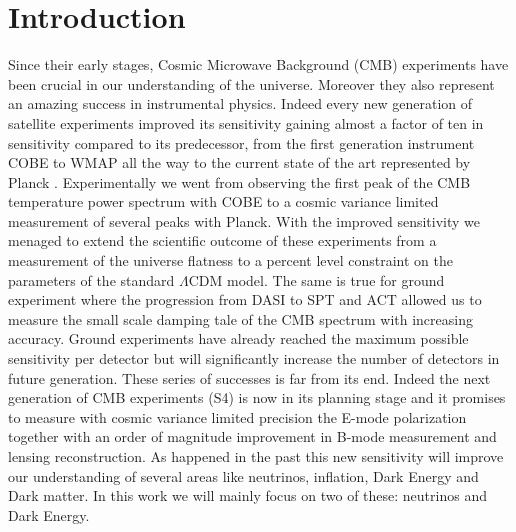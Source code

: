 \documentclass[aps,prd,preprint,groupedaddress]{revtex4-1}
\begin{document}
\pacs{}
\maketitle

\section{Introduction}\label{sec:intro}

Since their early stages, Cosmic Microwave Background (CMB) experiments have been crucial in our understanding of the universe. Moreover they also represent an amazing success in instrumental physics. Indeed every new generation of satellite experiments improved its sensitivity gaining almost a factor of ten in sensitivity compared to its predecessor, from the first generation instrument COBE to WMAP all the way to the current state of the art represented by Planck \cite{2015arXiv150201589P,2014A&A...571A..16P,2003ApJS..148..175S,2000ApJ...545L...5H,2000Natur.404..955D}.
Experimentally we went from observing the first peak of the CMB temperature power spectrum with COBE to a cosmic variance limited measurement of several peaks with Planck. With the improved sensitivity we menaged to extend the scientific outcome of these experiments from a measurement of the universe flatness to a percent level constraint on the parameters of the standard $\Lambda$CDM model.
The same is true for ground experiment where the progression from DASI \cite{2002ApJ...568...38H} to SPT and ACT \cite{2011ApJ...739...52D} \cite{2011ApJ...743...28K} allowed us to measure the small scale damping tale of the CMB spectrum with increasing accuracy.  Ground experiments have already reached the maximum possible sensitivity per detector but will significantly increase the number of detectors in future generation.
These series of successes is far from its end. Indeed the next generation of CMB experiments (S4) is now in its planning stage and it promises to measure with cosmic variance limited precision the E-mode polarization together with an order of magnitude improvement in B-mode measurement and lensing reconstruction.
As happened in the past this new sensitivity will improve our understanding of several areas like neutrinos, inflation, Dark Energy and Dark matter. In this work we will mainly focus on two of these: neutrinos and Dark Energy.
\end{document}
